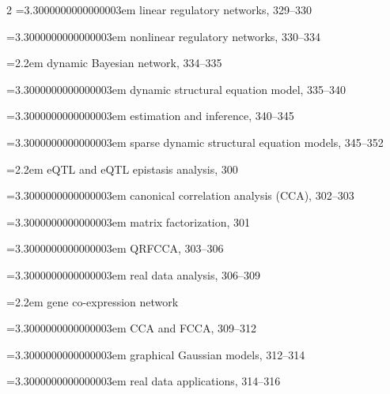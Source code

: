 \begin{multicols}{2}
\noindent\hangindent=3.3000000000000003em \hspace*{2.2em}linear regulatory networks, 329--330\par
\noindent\hangindent=3.3000000000000003em \hspace*{2.2em}nonlinear regulatory networks, 330--334\par
\noindent\hangindent=2.2em \hspace*{1.1em}dynamic Bayesian network, 334--335\par
\noindent\hangindent=3.3000000000000003em \hspace*{2.2em}dynamic structural equation model, 335--340\par
\noindent\hangindent=3.3000000000000003em \hspace*{2.2em}estimation and inference, 340--345\par
\noindent\hangindent=3.3000000000000003em \hspace*{2.2em}sparse dynamic structural equation models, 345--352\par
\noindent\hangindent=2.2em \hspace*{1.1em}eQTL and eQTL epistasis analysis, 300\par
\noindent\hangindent=3.3000000000000003em \hspace*{2.2em}canonical correlation analysis (CCA), 302--303\par
\noindent\hangindent=3.3000000000000003em \hspace*{2.2em}matrix factorization, 301\par
\noindent\hangindent=3.3000000000000003em \hspace*{2.2em}QRFCCA, 303--306\par
\noindent\hangindent=3.3000000000000003em \hspace*{2.2em}real data analysis, 306--309\par
\noindent\hangindent=2.2em \hspace*{1.1em}gene co-expression network\par
\noindent\hangindent=3.3000000000000003em \hspace*{2.2em}CCA and FCCA, 309--312\par
\noindent\hangindent=3.3000000000000003em \hspace*{2.2em}graphical Gaussian models, 312--314\par
\noindent\hangindent=3.3000000000000003em \hspace*{2.2em}real data applications, 314--316\par

\end{multicols}
